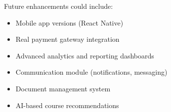 \documentclass[12pt]{article}
\begin{document}
Future enhancements could include:
\begin{itemize}
    \item Mobile app versions (React Native)
    \item Real payment gateway integration
    \item Advanced analytics and reporting dashboards
    \item Communication module (notifications, messaging)
    \item Document management system
    \item AI-based course recommendations
\end{itemize}
\end{document}
